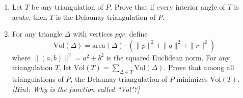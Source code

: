 \documentclass{article}
\begin{document}
    \begin{enumerate}[label=(\alph*)]
        \item Let $T$ be any triangulation of $P$. Prove that if every interior angle of $T$ is acute, then $T$ is the Delaunay triangulation of $P$.
        \item For any triangle $\Delta$ with vertices $pqr$, define
        \[ \text{Vol}(\Delta) = \text{area}(\Delta) \cdot (\|p\|^2 + \|q\|^2 + \|r\|^2) \]
        where $\|(a, b)\|^2 = a^2 + b^2$ is the squared Euclidean norm. For any triangulation $T$, let $\text{Vol}(T) = \sum_{\Delta \in T} \text{Vol}(\Delta)$. Prove that among all triangulations of $P$, the Delaunay triangulation of $P$ minimizes $\text{Vol}(T)$. \textit{[Hint: Why is the function called ``Vol"?]}
    \end{enumerate}
\end{document}
